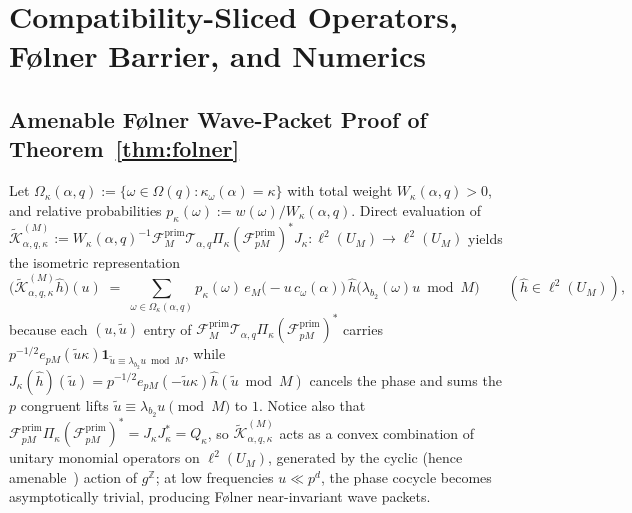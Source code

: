 \documentclass[11pt,a4paper]{article}
\numberwithin{equation}{section}
\theoremstyle{definition}
\theoremstyle{remark}
\newcommand{\Z}{\mathbb{Z}}
\newcommand{\cF}{\mathcal{F}}
\newcommand{\cT}{\mathcal{T}}
\newcommand{\cK}{\mathcal{K}}
\newcommand{\prim}{\mathrm{prim}}
\begin{document}
\section{Compatibility-Sliced Operators, F{\o}lner Barrier, and Numerics}\label{sec:folner}

\subsection{Amenable F{\o}lner Wave-Packet Proof of Theorem~\ref{thm:folner}}\label{subsec:folner_proof}

Let $\Omega_\kappa(\alpha, q) := \{\omega \in \Omega(q) : \kappa_\omega(\alpha) = \kappa\}$ with total weight $W_\kappa(\alpha, q) > 0$, and relative probabilities $p_\kappa(\omega) := w(\omega)/W_\kappa(\alpha, q)$. Direct evaluation of $\widetilde{\cK}_{\alpha, q, \kappa}^{(M)} := W_\kappa(\alpha, q)^{-1}\cF_M^{\prim}\cT_{\alpha, q}\Pi_\kappa(\cF_{pM}^{\prim})^* J_\kappa : \ell^2(U_M) \to \ell^2(U_M)$ yields the isometric representation
\[
\bigl(\widetilde{\cK}_{\alpha, q, \kappa}^{(M)}\hat h\bigr)(u) \;=\; \sum_{\omega \in \Omega_\kappa(\alpha, q)} p_\kappa(\omega)\, e_M\bigl(-u\,c_\omega(\alpha)\bigr)\, \hat h\bigl(\lambda_{b_2}(\omega)u \bmod M\bigr) \qquad (\hat h \in \ell^2(U_M)),
\]
because each $(u, \tilde u)$ entry of $\cF_M^{\prim}\cT_{\alpha, q}\Pi_\kappa(\cF_{pM}^{\prim})^*$ carries $p^{-1/2}e_{pM}(\tilde u \kappa)\mathbf{1}_{\tilde u \equiv \lambda_{b_2} u \bmod M}$, while $J_\kappa(\hat h)(\tilde u) = p^{-1/2}e_{pM}(-\tilde u \kappa)\hat h(\tilde u \bmod M)$ cancels the phase and sums the $p$ congruent lifts $\tilde u \equiv \lambda_{b_2} u \pmod M$ to $1$. Notice also that $\cF_{pM}^{\prim}\Pi_\kappa(\cF_{pM}^{\prim})^* = J_\kappa J_\kappa^* = Q_\kappa$, so $\widetilde{\cK}_{\alpha, q, \kappa}^{(M)}$ acts as a convex combination of unitary monomial operators on $\ell^2(U_M)$, generated by the cyclic (hence amenable~\cite{Kesten1959}) action of $g^\Z$; at low frequencies $u \ll p^d$, the phase cocycle becomes asymptotically trivial, producing F{\o}lner near-invariant wave packets.
\end{document}
